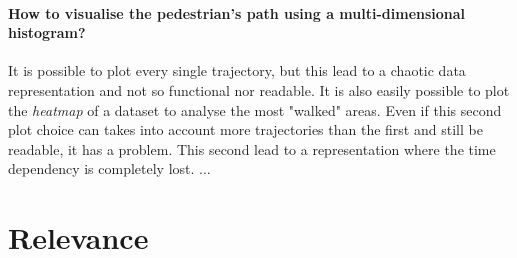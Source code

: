 \documentclass[class=article, crop=false]{standalone}
\begin{document}
\paragraph{How to visualise the pedestrian's path using a multi-dimensional histogram?}
It is possible to plot every single trajectory, but this lead to a chaotic data representation and not so functional nor readable.
It is also easily possible to plot the \emph{heatmap} of a dataset to analyse the most "walked" areas.
Even if this second plot choice can takes into account more trajectories than the first and still be readable, it has a problem.
This second lead to a representation where the time dependency is completely lost.
...





\section{Relevance}
\end{document}
